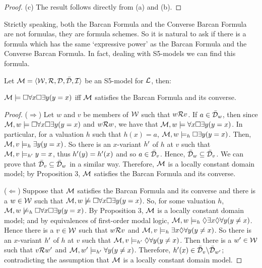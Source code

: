 \begin{proof}
\qquad (c) The result follows directly from (a) and (b). 
\end{proof}

\qquad Strictly speaking, both the Barcan Formula and the Converse Barcan Formula are not formulas, they are formula schemes. So it is natural to ask if there is a formula which has the same `expressive power' as the Barcan Formula and the Converse Barcan Formula. In fact, dealing with S5-models we can find this formula.

\begin{pro}
Let $\mathcal{M} = \langle\mathcal{W},\mathcal{R}, \mathcal{D}, \bar{\mathcal{D}},\mathcal{I}\rangle$ be an S5-model for $\mathcal{L}$, then:
\begin{center}
$\mathcal{M} \models \Box \forall x \Box \exists y (y=x)$ iff $\mathcal{M}$ satisfies the Barcan Formula and its converse.
\end{center}
\end{pro}


\begin{proof}
($\Rightarrow$) Let $w$ and $v$ be members of $\mathcal{W}$ such that $w \mathcal{R} v$. If $a \in \bar{\mathcal{D}}_{w}$, then since $\mathcal{M},w \models \Box\forall x \Box \exists y (y=x)$ and $w\mathcal{R} w$, we have that $\mathcal{M},w \models \forall x \Box \exists y (y=x)$. In particular, for a valuation $h$ such that $h(x) = a$, $\mathcal{M},w \models_{h} \Box \exists y (y=x)$. Then, $\mathcal{M},v \models_{h} \exists y (y=x)$. So there is an $x$-variant $h^{\prime}$ of $h$ at $v$ such that $\mathcal{M},v \models_{h^{\prime}} y=x$, thus $h^{\prime} (y) = h^{\prime} (x)$ and so $a \in \bar{\mathcal{D}}_{v}$. Hence, $\bar{\mathcal{D}}_{w} \subseteq \bar{\mathcal{D}}_{v}$. We can prove that $\bar{\mathcal{D}}_{v} \subseteq \bar{\mathcal{D}}_{w}$ in a similar way. Therefore, $\mathcal{M}$  is a locally constant domain model; by Proposition 3, $\mathcal{M}$ satisfies the Barcan Formula and its converse.   

\qquad ($\Leftarrow$) Suppose that $\mathcal{M}$ satisfies the Barcan Formula and its converse and there is a $w \in \mathcal{W}$ such that $\mathcal{M},w \not\models \Box \forall x \Box \exists y (y=x)$. So, for some valuation $h$, $\mathcal{M},w \not\models_{h} \Box \forall x \Box \exists y (y=x)$. By Proposition 3, $\mathcal{M}$  is a locally constant domain model; and by equivalences of first-order modal logic, $\mathcal{M},w \models_{h} \Diamond \exists x \Diamond \forall y (y \neq x)$. Hence there is a $v \in \mathcal{W}$ such that $w\mathcal{R} v$ and $\mathcal{M},v \models_{h} \exists x \Diamond \forall y (y \neq x)$. So there is an $x$-variant $h^{\prime}$ of $h$ at $v$ such that $\mathcal{M},v \models_{h^{\prime}} \Diamond \forall y (y \neq x)$. Then there is a $w^{\prime} \in \mathcal{W}$ such that $v\mathcal{R} w^{\prime}$ and $\mathcal{M},w^{\prime} \models_{h^{\prime}} \forall y (y \neq x)$. Therefore, $h^{\prime}(x) \in \bar{\mathcal{D}}_{v}\backslash\bar{\mathcal{D}}_{w^{\prime}}$;  contradicting the assumption that $\mathcal{M}$  is a locally constant domain model.  
\end{proof}

